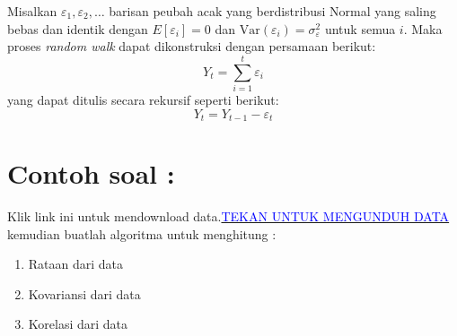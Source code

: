 \documentclass[
]{book}
\newenvironment{Shaded}{\begin{snugshade}}{\end{snugshade}}
\newcommand{\AttributeTok}[1]{\textcolor[rgb]{0.13,0.29,0.53}{#1}}
\newcommand{\CommentTok}[1]{\textcolor[rgb]{0.56,0.35,0.01}{\textit{#1}}}
\newcommand{\DecValTok}[1]{\textcolor[rgb]{0.00,0.00,0.81}{#1}}
\newcommand{\FunctionTok}[1]{\textcolor[rgb]{0.13,0.29,0.53}{\textbf{#1}}}
\newcommand{\NormalTok}[1]{#1}
\newcommand{\OtherTok}[1]{\textcolor[rgb]{0.56,0.35,0.01}{#1}}
\newcommand{\SpecialCharTok}[1]{\textcolor[rgb]{0.81,0.36,0.00}{\textbf{#1}}}
\newcommand{\StringTok}[1]{\textcolor[rgb]{0.31,0.60,0.02}{#1}}
\begin{document}
Misalkan \(\varepsilon_1,\varepsilon_2, \dots\) barisan peubah acak yang berdistribusi Normal yang saling bebas dan identik dengan \(E[\varepsilon_i]=0\) dan \(\text{Var}(\varepsilon_i) =\sigma^2_\varepsilon\) untuk semua \(i\). Maka proses \emph{random walk} dapat dikonstruksi dengan persamaan berikut:
\begin{equation}
Y_t = \sum_{i=1}^t \varepsilon_i
\end{equation}
yang dapat ditulis secara rekursif seperti berikut:
\begin{equation}
Y_t = Y_{t-1} - \varepsilon_t
\end{equation}

\hypertarget{contoh-soal}{%
\section{Contoh soal :}\label{contoh-soal}}

\begin{jp}{}{}
Klik link ini untuk mendownload data.\href{https://drive.google.com/uc?export=download&id=1zevgGmfz87MJYn8OuIX5FEBgypR-DWnG}{\textcolor{blue}{TEKAN UNTUK MENGUNDUH DATA}} kemudian buatlah algoritma untuk menghitung :  
\begin{enumerate}
\item Rataan dari data  
\item Kovariansi dari data  
\item Korelasi dari data
\end{enumerate}
\end{jp}

\begin{Shaded}
\end{Shaded}
\end{document}
